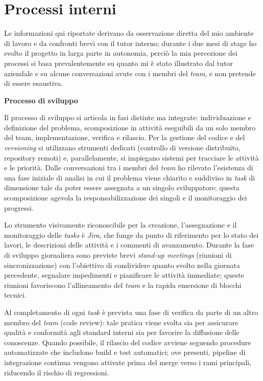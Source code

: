 \section{Processi interni}

Le informazioni qui riportate derivano da osservazione diretta del mio ambiente di lavoro e da confronti brevi con il tutor interno; 
durante i due mesi di stage ho svolto il progetto in larga parte in autonomia, perciò la mia percezione dei processi si basa prevalentemente su quanto mi è stato illustrato dal tutor aziendale 
e su alcune conversazioni avute con i membri del \emph{team}, e non pretende di essere esaustiva.

\medskip
\noindent\textbf{Processo di sviluppo}

Il processo di sviluppo si articola in fasi distinte ma integrate: individuazione e definizione del problema, 
scomposizione in attività eseguibili da un solo membro del team, implementazione, verifica e rilascio. 
Per la gestione del codice e del \emph{versioning} si utilizzano strumenti dedicati (controllo di versione distribuito, repository remoti) e, 
parallelamente, si impiegano sistemi per tracciare le attività e le priorità. Dalle conversazioni tra i membri del \emph{team} ho rilevato l’esistenza di una fase iniziale di 
analisi in cui il problema viene chiarito e suddiviso in \emph{task} di dimensione tale da poter essere assegnata a un singolo sviluppatore; questa scomposizione agevola la 
responsabilizzazione dei singoli e il monitoraggio dei progressi.

Lo strumento visivamente riconoscibile per la creazione, 
l’assegnazione e il monitoraggio delle \emph{tasks} è \emph{Jira}, che funge da punto di riferimento per lo stato dei lavori, le descrizioni delle attività e i commenti di avanzamento. 
Durante la fase di sviluppo giornaliera sono previste brevi \emph{stand-up meetings} (riunioni di sincronizzazione) con l’obiettivo di condividere quanto svolto nella giornata precedente, 
segnalare impedimenti e pianificare le attività immediate; queste riunioni favoriscono l’allineamento del \emph{team} e la rapida emersione di blocchi tecnici.

Al completamento di ogni \emph{task} è prevista una fase di verifica da parte di un altro membro del \emph{team} (code review): 
tale pratica viene svolta sia per assicurare qualità e conformità agli standard interni sia per favorire la diffusione delle conoscenze. 
Quando possibile, il rilascio del codice avviene seguendo procedure automatizzate che includono build e test automatici; ove presenti, 
pipeline di integrazione continua vengono attivate prima del merge verso i rami principali, riducendo il rischio di regressioni.

